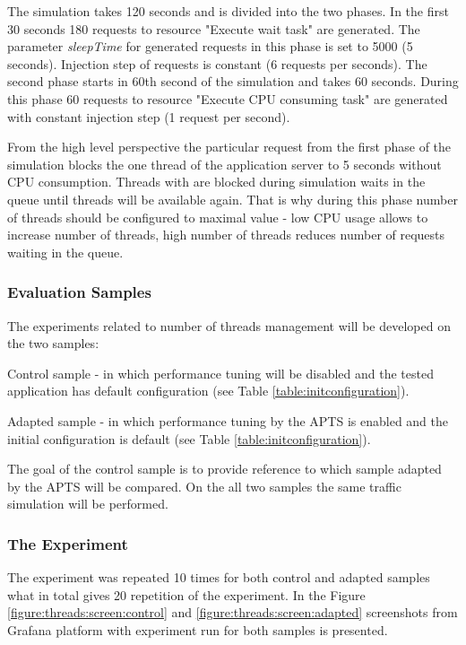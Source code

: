 \documentclass[10pt,a4paper]{article}
\let\tempone\itemize
\let\temptwo\enditemize
\renewenvironment{itemize}{\tempone\addtolength{\itemsep}{-0.4\baselineskip}}{\temptwo}
\begin{document}
The simulation takes 120 seconds and is divided into the two phases. In the first 30 seconds 180 requests to resource "Execute wait task" are generated. The parameter \textit{sleepTime} for generated requests in this phase is set to 5000 (5 seconds). Injection step of requests is constant (6 requests per seconds). The second phase starts in 60th second of the simulation and takes 60 seconds. During this phase 60 requests to resource "Execute CPU consuming task" are generated with constant injection step (1 request per second). 

From the high level perspective the particular request from the first phase of the simulation blocks the one thread of the application server to 5 seconds without CPU consumption. Threads with are blocked during simulation waits in the queue until threads will be available again. That is why during this phase number of threads should be configured to maximal value - low CPU usage allows to increase number of threads, high number of threads reduces number of requests waiting in the queue.   

 
\subsubsection{Evaluation Samples}

The experiments related to number of threads management will be developed on the two samples:
\begin{itemize}
\item Control sample - in which performance tuning will be disabled and the tested application has default  configuration (see Table \ref{table:initconfiguration}).  
\item Adapted sample - in which performance tuning by the APTS is enabled and the initial configuration is default (see Table \ref{table:initconfiguration}).
\end{itemize}

The goal of the control sample is to provide reference to which sample adapted by the APTS will be compared. On the all two samples the same traffic simulation will be performed.
 
\subsubsection{The Experiment} 

The experiment was repeated 10 times for both control and adapted samples what in total gives 20 repetition of the experiment. In the Figure \ref{figure:threads:screen:control} and \ref{figure:threads:screen:adapted} screenshots from Grafana platform with experiment run for both samples is presented.
\end{document}
